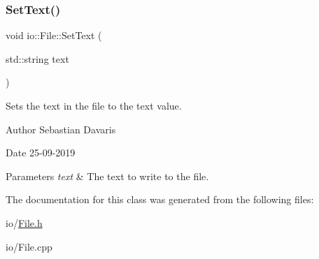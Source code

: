 \subsubsection{\texorpdfstring{Set\+Text()}{SetText()}}
{\footnotesize\ttfamily void io\+::\+File\+::\+Set\+Text (\begin{DoxyParamCaption}\item[{std\+::string}]{text }\end{DoxyParamCaption})}

Sets the text in the file to the text value. \begin{DoxyAuthor}{Author}
Sebastian Davaris 
\end{DoxyAuthor}
\begin{DoxyDate}{Date}
25-\/09-\/2019 
\end{DoxyDate}

\begin{DoxyParams}{Parameters}
{\em text} & The text to write to the file. \\
\hline
\end{DoxyParams}


The documentation for this class was generated from the following files\+:\begin{DoxyCompactItemize}
\item 
io/\hyperlink{_file_8h}{File.\+h}\item 
io/File.\+cpp\end{DoxyCompactItemize}
